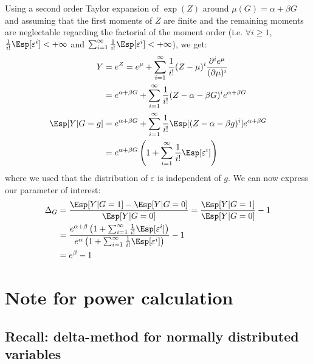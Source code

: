 \documentclass[12pt]{article}
\begin{document}
Using a second order Taylor expansion of \(\exp(Z)\) around
\(\mu(G)=\alpha + \beta G\) and assuming that the first moments of
\(Z\) are finite and the remaining moments are neglectable regarding
the factorial of the moment order (i.e. \(\forall i \geq 1\),
\(\frac{1}{i!}\Esp[\varepsilon^i ]< +\infty\) and \(\sum_{i=1}^{\infty} \frac{1}{i!}\Esp[\varepsilon^i ]< +\infty\)), we get:
\begin{align*}
Y &= e^{Z} = e^{\mu} + \sum_{i=1}^{\infty} \frac{1}{i!} (Z - \mu)^i \frac{\partial^i e^{\mu}}{(\partial \mu)^i} \\
&= e^{\alpha + \beta G} + \sum_{i=1}^{\infty} \frac{1}{i!} (Z - \alpha - \beta G)^i e^{\alpha + \beta G} \\
\Esp[Y|G=g] &= e^{\alpha + \beta G} + \sum_{i=1}^{\infty} \frac{1}{i!} \Esp[(Z - \alpha - \beta g)^i] e^{\alpha + \beta G} \\
&= e^{\alpha + \beta G} \left(1 + \sum_{i=1}^{\infty} \frac{1}{i!} \Esp[\varepsilon^i] \right)
\end{align*}
where we used that the distribution of \(\varepsilon\) is independent
of \(g\). We can now express our parameter of interest:
\begin{align*}
\Delta_G &= \frac{\Esp[Y|G=1]-\Esp[Y|G=0]}{\Esp[Y|G=0]} = \frac{\Esp[Y|G=1]}{\Esp[Y|G=0]} - 1 \\
&= \frac{e^{\alpha + \beta} \left(1 + \sum_{i=1}^{\infty} \frac{1}{i!} \Esp[\varepsilon^{i}] \right)}{e^{\alpha} \left(1 + \sum_{i=1}^{\infty} \frac{1}{i!} \Esp[\varepsilon^{i}] \right)} - 1 \\
&= e^{\beta} - 1
\end{align*}


\clearpage

\section{Note for power calculation}
\label{sec:orga9a3b5a}

\subsection{Recall: delta-method for normally distributed variables}
\label{sec:orgeaad2fd}
\end{document}
